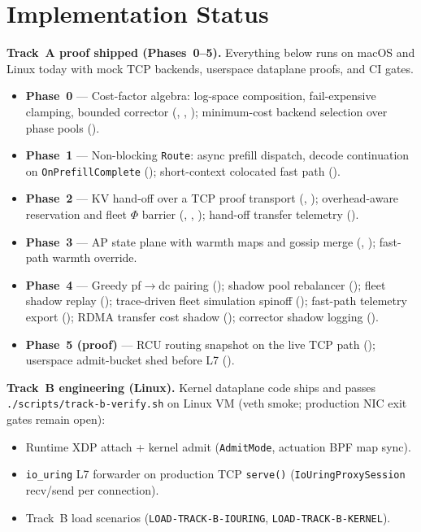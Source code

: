 \documentclass[11pt]{article}
\begin{document}
\section{Implementation Status}\label{sec:status}
\textbf{Track~A proof shipped (Phases~0--5).} Everything below runs on macOS and
Linux today with mock TCP backends, userspace dataplane proofs, and CI gates.
\begin{itemize}[nosep]
  \item \textbf{Phase~0} --- Cost-factor algebra: log-space composition, fail-expensive
        clamping, bounded corrector (, ,
        ); minimum-cost backend selection over phase pools
        ().
  \item \textbf{Phase~1} --- Non-blocking \texttt{Route}: async prefill dispatch,
        decode continuation on \texttt{OnPrefillComplete} ();
        short-context colocated fast path ().
  \item \textbf{Phase~2} --- KV hand-off over a TCP proof transport
        (, ); overhead-aware reservation
        and fleet $\Phi$ barrier (, ,
        ); hand-off transfer telemetry
        ().
  \item \textbf{Phase~3} --- AP state plane with warmth maps and gossip merge
        (, ); fast-path warmth override.
  \item \textbf{Phase~4} --- Greedy pf$\to$dc pairing ();
        shadow pool rebalancer (); fleet shadow replay
        (); trace-driven fleet simulation spinoff
        (); fast-path telemetry export
        (); RDMA transfer cost shadow
        (); corrector shadow logging
        ().
  \item \textbf{Phase~5 (proof)} --- RCU routing snapshot on the live TCP path
        (); userspace admit-bucket shed before L7
        ().
\end{itemize}

\textbf{Track~B engineering (Linux).} Kernel dataplane code ships and passes
\texttt{./scripts/track-b-verify.sh} on Linux VM (veth smoke; production NIC exit
gates remain open):
\begin{itemize}[nosep]
  \item Runtime XDP attach + kernel admit (\texttt{AdmitMode}, actuation BPF map sync).
  \item \texttt{io\_uring} L7 forwarder on production TCP \texttt{serve()}
        (\texttt{IoUringProxySession} recv/send per connection).
  \item Track~B load scenarios (\texttt{LOAD-TRACK-B-IOURING}, \texttt{LOAD-TRACK-B-KERNEL}).
\end{itemize}
\end{document}
